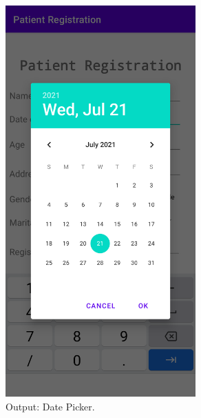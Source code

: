 \documentclass[12pt, a4]{article}
\begin{document}
\newpage
\subsection*{}
\begin{figure}[h]
\centering
\caption{Output: Date Picker.}
\includegraphics[height=15cm, width=7.3cm]{PatientRegistration/Screenshots/DatePicker.png}
\end{figure}

\newpage
\end{document}
